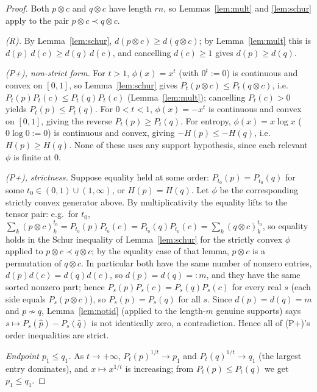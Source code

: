 \documentclass{amsart}
\theoremstyle{plain}
\theoremstyle{definition}
\newcommand{\maj}{\prec}
\begin{document}
\begin{proof}
Both $p\otimes c$ and $q\otimes c$ have length $rn$, so Lemmas~\ref{lem:mult} and
\ref{lem:schur} apply to the pair $p\otimes c\maj q\otimes c$.

\emph{(R).} By Lemma~\ref{lem:schur}, $d(p\otimes c)\ge d(q\otimes c)$; by
Lemma~\ref{lem:mult} this is $d(p)\,d(c)\ge d(q)\,d(c)$, and cancelling $d(c)\ge1$ gives
$d(p)\ge d(q)$.

\emph{(P+), non-strict form.} For $t>1$, $\phi(x)=x^t$ (with $0^t:=0$) is continuous and
convex on $[0,1]$, so Lemma~\ref{lem:schur} gives
$P_t(p\otimes c)\le P_t(q\otimes c)$, i.e.\ $P_t(p)P_t(c)\le P_t(q)P_t(c)$
(Lemma~\ref{lem:mult}); cancelling $P_t(c)>0$ yields $P_t(p)\le P_t(q)$. For
$0<t<1$, $\phi(x)=-x^t$ is continuous and convex on $[0,1]$, giving the reverse
$P_t(p)\ge P_t(q)$. For entropy, $\phi(x)=x\log x$ ($0\log0:=0$) is continuous and
convex, giving $-H(p)\le-H(q)$, i.e.\ $H(p)\ge H(q)$. None of these uses any support
hypothesis, since each relevant $\phi$ is finite at $0$.

\emph{(P+), strictness.} Suppose equality held at some order: $P_{t_0}(p)=P_{t_0}(q)$
for some $t_0\in(0,1)\cup(1,\infty)$, or $H(p)=H(q)$. Let $\phi$ be the corresponding
strictly convex generator above. By multiplicativity the equality lifts to the tensor
pair: e.g.\ for $t_0$,
$\sum_k(p\otimes c)_k^{t_0}=P_{t_0}(p)P_{t_0}(c)=P_{t_0}(q)P_{t_0}(c)
=\sum_k(q\otimes c)_k^{t_0}$, so equality holds in the Schur inequality of
Lemma~\ref{lem:schur} for the strictly convex $\phi$ applied to
$p\otimes c\maj q\otimes c$; by the equality case of that lemma, $p\otimes c$ is a
permutation of $q\otimes c$. In particular both have the same number of nonzero
entries, $d(p)d(c)=d(q)d(c)$, so $d(p)=d(q)=:m$, and they have the same sorted nonzero
part; hence $P_s(p)P_s(c)=P_s(q)P_s(c)$ for every real $s$ (each side equals
$P_s(p\otimes c)$), so $P_s(p)=P_s(q)$ for all $s$. Since $d(p)=d(q)=m$ and
$p\not\sim q$, Lemma~\ref{lem:notid} (applied to the length-$m$ genuine supports) says
$s\mapsto P_s(\hat p)-P_s(\hat q)$ is not identically zero, a contradiction. Hence all
of (P+)'s order inequalities are strict.

\emph{Endpoint $p_1\le q_1$.} As $t\to+\infty$, $P_t(p)^{1/t}\to p_1$ and
$P_t(q)^{1/t}\to q_1$ (the largest entry dominates), and $x\mapsto x^{1/t}$ is
increasing; from $P_t(p)\le P_t(q)$ we get $p_1\le q_1$.


\end{proof}
\end{document}
